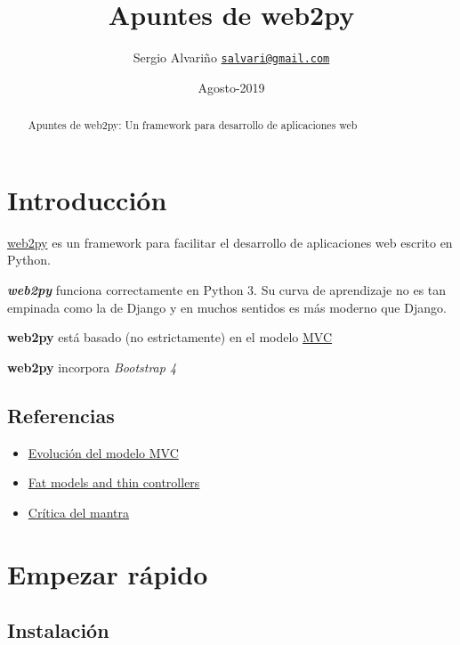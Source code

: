 \documentclass[
  12pt,
  spanish,
]{article}
\title{Apuntes de web2py}
\author{Sergio Alvariño
\href{mailto:salvari@gmail.com}{\nolinkurl{salvari@gmail.com}}}
\date{Agosto-2019}
\providecommand{\tightlist}{%
  \setlength{\itemsep}{0pt}\setlength{\parskip}{0pt}}
\begin{document}
\maketitle
\begin{abstract}
Apuntes de web2py: Un framework para desarrollo de aplicaciones web
\end{abstract}

{
\hypersetup{linkcolor=}
\setcounter{tocdepth}{3}
\tableofcontents
}
\hypertarget{introducciuxf3n}{%
\section{Introducción}\label{introducciuxf3n}}

\href{http://www.web2py.com/}{web2py} es un framework para facilitar el
desarrollo de aplicaciones web escrito en Python.

\textbf{\emph{web2py}} funciona correctamente en Python 3. Su curva de
aprendizaje no es tan empinada como la de Django y en muchos sentidos es
más moderno que Django.

\textbf{web2py} está basado (no estrictamente) en el modelo
\href{https://es.wikipedia.org/wiki/Modelo\%E2\%80\%93vista\%E2\%80\%93controlador}{MVC}

\textbf{web2py} incorpora \emph{Bootstrap 4}

\hypertarget{referencias}{%
\subsection{Referencias}\label{referencias}}

\begin{itemize}
\tightlist
\item
  \href{https://martinfowler.com/eaaDev/uiArchs.html}{Evolución del
  modelo MVC}
\item
  \href{https://nomadphp.com/blog/60/working-with-the-thin-controller-and-fat-model-concept-in-laravel}{Fat
  models and thin controllers}
\item
  \href{https://nomadphp.com/blog/60/working-with-the-thin-controller-and-fat-model-concept-in-laravel}{Crítica
  del mantra}
\end{itemize}

\hypertarget{empezar-ruxe1pido}{%
\section{Empezar rápido}\label{empezar-ruxe1pido}}

\hypertarget{instalaciuxf3n}{%
\subsection{Instalación}\label{instalaciuxf3n}}
\end{document}
